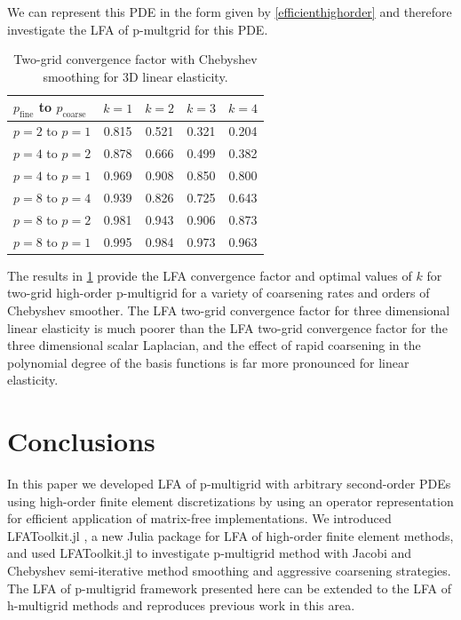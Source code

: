 \documentclass[review]{siamart190516}
\begin{document}
We can represent this PDE in the form given by \cref{efficienthighorder} and therefore investigate the LFA of p-multgrid for this PDE.

\begin{table}[ht!]
\begin{center}
\begin{tabular}{l c c c c}
  \toprule
  $p_{\text{fine}}$ to $p_{\text{coarse}}$  &  $k = 1$   &  $k = 2$   &  $k = 3$   &  $k = 4$   \\
  \toprule
  $p = 2$ to $p = 1$   &  0.815  &  0.521  &  0.321  &  0.204  \\
  \midrule
  $p = 4$ to $p = 2$   &  0.878  &  0.666  &  0.499  &  0.382  \\
  $p = 4$ to $p = 1$   &  0.969  &  0.908  &  0.850  &  0.800  \\
  \midrule
  $p = 8$ to $p = 4$   &  0.939  &  0.826  &  0.725  &  0.643  \\
  $p = 8$ to $p = 2$   &  0.981  &  0.943  &  0.906  &  0.873  \\
  $p = 8$ to $p = 1$   &  0.995  &  0.984  &  0.973  &  0.963  \\
  \bottomrule
\end{tabular}
\end{center}
\caption{Two-grid convergence factor with Chebyshev smoothing for 3D linear elasticity.}
\label{table:two_grid_3d_linear_elasticity}
\end{table}

The results in \cref{table:two_grid_3d_linear_elasticity} provide the LFA convergence factor and optimal values of $k$ for two-grid high-order p-multigrid for a variety of coarsening rates and orders of Chebyshev smoother.
The LFA two-grid convergence factor for three dimensional linear elasticity is much poorer than the LFA two-grid convergence factor for the three dimensional scalar Laplacian, and the effect of rapid coarsening in the polynomial degree of the basis functions is far more pronounced for linear elasticity.

\section{Conclusions}\label{sec:conclusion}

In this paper we developed LFA of p-multigrid with arbitrary second-order PDEs using high-order finite element discretizations by using an operator representation for efficient application of matrix-free implementations.
We introduced LFAToolkit.jl \cite{thompson2021toolkit}, a new Julia package for LFA of high-order finite element methods, and used LFAToolkit.jl to investigate p-multigrid method with Jacobi and Chebyshev semi-iterative method smoothing and aggressive coarsening strategies.
The LFA of p-multigrid framework presented here can be extended to the LFA of h-multigrid methods and reproduces previous work in this area.
\end{document}
